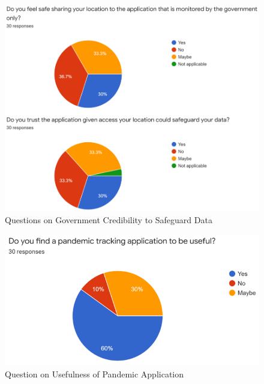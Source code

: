 \begin{enumerate}[a)]
\begin{itemize}
\begin{figure}[H]
                \includegraphics[width=\textwidth]{img/findings-1.png}
                \caption{Questions on Government Credibility to Safeguard Data}
                \label{fig:findings-1}
              \end{figure}
              \begin{figure}[H]
                \centering
                \includegraphics[width=14cm]{img/findings-2.png}
                \caption{Question on Usefulness of Pandemic Application}
                \label{fig:findings-2}
              \end{figure}
              \begin{figure}[H]
                \centering

\end{figure}
\end{itemize}
\end{enumerate}

